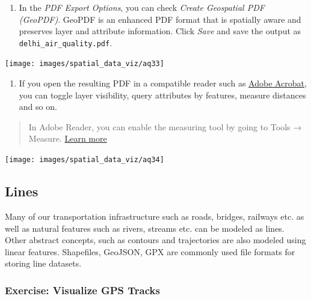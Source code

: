 \documentclass[
  12pt,
  a4paper]{article}
\providecommand{\tightlist}{%
  \setlength{\itemsep}{0pt}\setlength{\parskip}{0pt}}
\begin{document}
\begin{enumerate}
\def\labelenumi{\arabic{enumi}.}
\setcounter{enumi}{32}
\tightlist
\item
  In the \emph{PDF Export Options}, you can check \emph{Create
  Geospatial PDF (GeoPDF)}. GeoPDF is an enhanced PDF format that is
  spatially aware and preserves layer and attribute information. Click
  \emph{Save} and save the output as \texttt{delhi\_air\_quality.pdf}.
\end{enumerate}

\begin{center}\texttt{[image: images/spatial\_data\_viz/aq33]} \end{center}

\begin{enumerate}
\def\labelenumi{\arabic{enumi}.}
\setcounter{enumi}{33}
\tightlist
\item
  If you open the resulting PDF in a compatible reader such as
  \href{https://get.adobe.com/reader/}{Adobe Acrobat}, you can toggle
  layer visibility, query attributes by features, measure distances and
  so on.
\end{enumerate}

\begin{quote}
In Adobe Reader, you can enable the measuring tool by going to Tools →
Measure.
\href{https://helpx.adobe.com/in/acrobat/using/grids-guides-measurements-pdfs.html\#measure_the_height_width_or_area_of_objects}{Learn
more}
\end{quote}

\begin{center}\texttt{[image: images/spatial\_data\_viz/aq34]} \end{center}

\newpage

\hypertarget{lines}{%
\subsection{Lines}\label{lines}}

Many of our transportation infrastructure such as roads, bridges,
railways etc. as well as natural features such as rivers, streams etc.
can be modeled as lines. Other abstract concepts, such as contours and
trajectories are also modeled using linear features. Shapefiles,
GeoJSON, GPX are commonly used file formats for storing line datasets.

\hypertarget{exercise-visualize-gps-tracks}{%
\subsubsection{Exercise: Visualize GPS
Tracks}\label{exercise-visualize-gps-tracks}}
\end{document}
